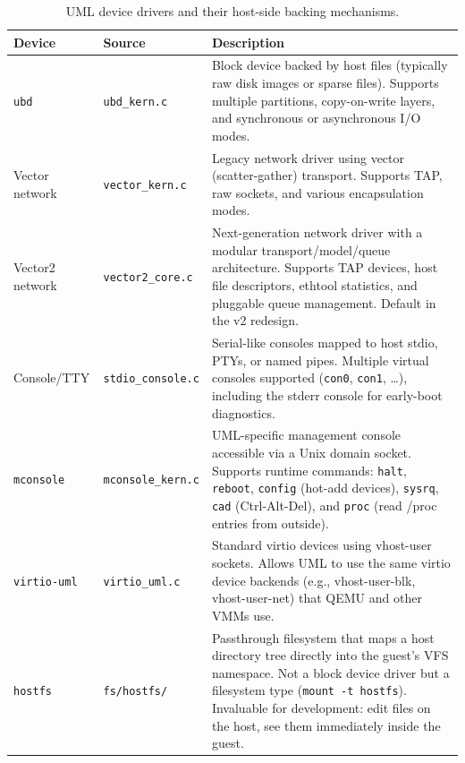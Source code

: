 \begin{table}[ht]
\centering
\caption{UML device drivers and their host-side backing mechanisms.}
\label{tab:devices}
\begin{tabularx}{\textwidth}{l l Y}
\toprule
\textbf{Device} & \textbf{Source} & \textbf{Description} \\
\midrule
\texttt{ubd} &
  \texttt{ubd\_kern.c} &
  Block device backed by host files (typically raw disk images or sparse
  files).  Supports multiple partitions, copy-on-write layers, and synchronous
  or asynchronous I/O modes. \\

Vector network &
  \texttt{vector\_kern.c} &
  Legacy network driver using vector (scatter-gather) transport.  Supports
  TAP, raw sockets, and various encapsulation modes. \\

Vector2 network &
  \texttt{vector2\_core.c} &
  Next-generation network driver with a modular transport/model/queue
  architecture.  Supports TAP devices, host file descriptors, ethtool
  statistics, and pluggable queue management.  Default in the v2
  redesign. \\

Console/TTY &
  \texttt{stdio\_console.c} &
  Serial-like consoles mapped to host stdio, PTYs, or named pipes.  Multiple
  virtual consoles supported (\texttt{con0}, \texttt{con1}, \ldots),
  including the stderr console for early-boot diagnostics. \\

\texttt{mconsole} &
  \texttt{mconsole\_kern.c} &
  UML-specific management console accessible via a Unix domain socket.
  Supports runtime commands: \texttt{halt}, \texttt{reboot}, \texttt{config}
  (hot-add devices), \texttt{sysrq}, \texttt{cad} (Ctrl-Alt-Del), and
  \texttt{proc} (read /proc entries from outside). \\

\texttt{virtio-uml} &
  \texttt{virtio\_uml.c} &
  Standard virtio devices using vhost-user sockets.  Allows UML to use the
  same virtio device backends (e.g., vhost-user-blk, vhost-user-net) that
  QEMU and other VMMs use. \\

\texttt{hostfs} &
  \texttt{fs/hostfs/} &
  Passthrough filesystem that maps a host directory tree directly into the
  guest's VFS namespace.  Not a block device driver but a filesystem type
  (\texttt{mount -t hostfs}).  Invaluable for development: edit files on
  the host, see them immediately inside the guest. \\


\end{tabularx}
\end{table}
